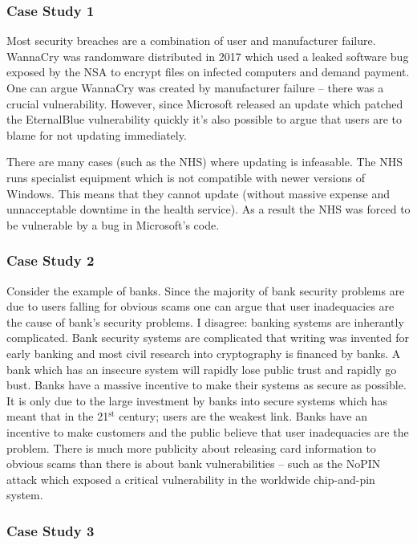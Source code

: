 \documentclass[10pt,\jkfside,a4paper]{article}
\begin{document}
\begin{enumerate}
\subsubsection*{Case Study 1}

Most security breaches are a combination of user and manufacturer failure. WannaCry was randomware 
distributed in 2017 which used a leaked software bug exposed by the NSA to encrypt files on infected 
computers and demand payment. One can argue WannaCry was created by manufacturer failure -- there was 
a crucial vulnerability. However, since Microsoft released an update which patched the EternalBlue 
vulnerability quickly it's also possible to argue that users are to blame for not updating immediately.

There are many cases (such as the NHS) where updating is infeasable. The NHS runs specialist 
equipment which is not compatible with newer versions of Windows. This means that they cannot 
update (without massive expense and unnacceptable downtime in the health service). As a result 
the NHS was forced to be vulnerable by a bug in Microsoft's code.

\subsubsection*{Case Study 2}

Consider the example of banks. Since the majority of bank security problems 
are due to users falling for obvious scams one can argue that user inadequacies are the cause 
of bank's security problems. I disagree: banking systems are inherantly complicated. Bank 
security systems are  complicated that writing 
was invented for early banking and most civil research into cryptography is financed by banks. 
A bank which has an insecure system will rapidly lose public 
trust and rapidly go bust. Banks have a massive incentive to make their systems as secure as possible. 
It is only due to the large investment by banks into secure systems which has meant that in 
the 21$^{\text{st}}$ century; users are the weakest link. Banks have an incentive to make 
customers and the public believe that user inadequacies are the problem. There is much more 
publicity about releasing card information to obvious scams than there is about bank vulnerabilities 
-- such as the NoPIN attack which exposed a critical vulnerability in the worldwide chip-and-pin 
system.

\subsubsection*{Case Study 3}


\end{enumerate}
\end{document}
